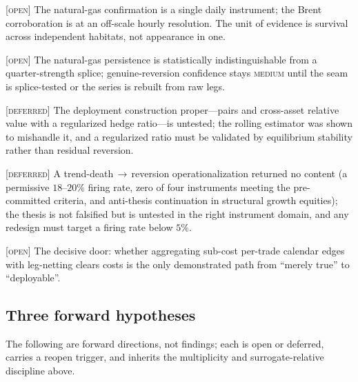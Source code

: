 \documentclass[11pt,a4paper]{article}
\newcommand{\status}[1]{{\small\textsc{[#1]}}}
\begin{document}
\begin{description}[leftmargin=1.4em,itemsep=2pt]
  \item[No cross-habitat daily replication.] \status{open} The natural-gas confirmation is a single
  daily instrument; the Brent corroboration is at an off-scale hourly resolution. The unit of evidence
  is survival across independent habitats, not appearance in one.
  \item[Back-adjustment not closed.] \status{open} The natural-gas persistence is statistically
  indistinguishable from a quarter-strength splice; genuine-reversion confidence stays \textsc{medium}
  until the seam is splice-tested or the series is rebuilt from raw legs.
  \item[No controlled-ratio pair.] \status{deferred} The deployment construction proper---pairs and
  cross-asset relative value with a regularized hedge ratio---is untested; the rolling estimator was
  shown to mishandle it, and a regularized ratio must be validated by equilibrium stability rather than
  residual reversion.
  \item[Trend-death detector.] \status{deferred} A trend-death$\,\rightarrow\,$reversion operationalization
  returned no content (a permissive $18$--$20\%$ firing rate, zero of four instruments meeting the
  pre-committed criteria, and anti-thesis continuation in structural growth equities); the thesis is not
  falsified but is untested in the right instrument domain, and any redesign must target a firing rate
  below $5\%$.
  \item[Portfolio economics.] \status{open} The decisive door: whether aggregating sub-cost per-trade
  calendar edges with leg-netting clears costs is the only demonstrated path from ``merely true'' to
  ``deployable''.
\end{description}

\subsection{Three forward hypotheses}

The following are forward directions, not findings; each is open or deferred, carries a reopen trigger,
and inherits the multiplicity and surrogate-relative discipline above.
\end{document}
